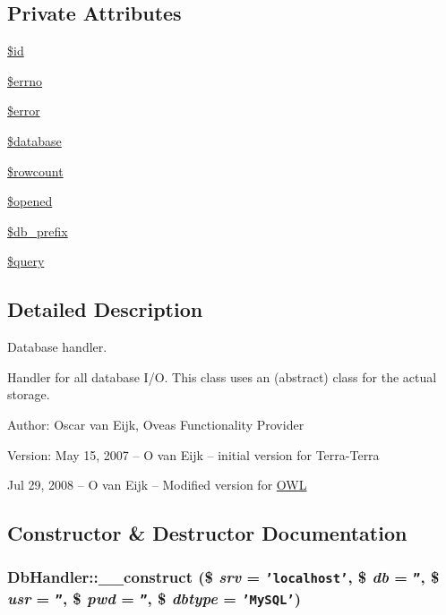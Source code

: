 \subsection*{Private Attributes}
\begin{CompactItemize}
\item 
\hyperlink{classDbHandler_d38e1c3312815c8ad4093957881092ff}{\$id}
\item 
\hyperlink{classDbHandler_f6e9f493be56617cb533763bb2a0e85a}{\$errno}
\item 
\hyperlink{classDbHandler_de79e11156abbfc180864beb5b9df377}{\$error}
\item 
\hyperlink{classDbHandler_faac5248f9ee59786b48a7b51f318940}{\$database}
\item 
\hyperlink{classDbHandler_56a7ae4bd7d842c85f3fe8052aecbfef}{\$rowcount}
\item 
\hyperlink{classDbHandler_71e36ffbff0d157b1d91dc000bc6f821}{\$opened}
\item 
\hyperlink{classDbHandler_19af96598e7f72673fc5da26ad77731b}{\$db\_\-prefix}
\item 
\hyperlink{classDbHandler_d671b5596b37dac6d48a660a07775965}{\$query}
\end{CompactItemize}


\subsection{Detailed Description}
Database handler. 

Handler for all database I/O. This class uses an (abstract) class for the actual storage. \begin{Desc}
\item[Author:]Oscar van Eijk, Oveas Functionality Provider \end{Desc}
\begin{Desc}
\item[Version:]May 15, 2007 -- O van Eijk -- initial version for Terra-Terra 

Jul 29, 2008 -- O van Eijk -- Modified version for \hyperlink{classOWL}{OWL} \end{Desc}


\subsection{Constructor \& Destructor Documentation}
\hypertarget{classDbHandler_e54e9d4643f41a9296167086f6a769fc}{
\subsubsection{\setlength{\rightskip}{0pt plus 5cm}DbHandler::\_\-\_\-construct (\$ {\em srv} = {\tt 'localhost'}, \$ {\em db} = {\tt ''}, \$ {\em usr} = {\tt ''}, \$ {\em pwd} = {\tt ''}, \$ {\em dbtype} = {\tt 'MySQL'})}}
\label{classDbHandler_e54e9d4643f41a9296167086f6a769fc}


